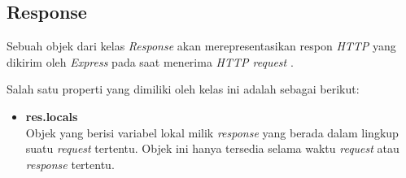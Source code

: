 \begin{itemize}
	
\end{itemize}

%
%	
%	

\subsection{Response}
Sebuah objek dari kelas \textit{Response} akan merepresentasikan respon \textit{HTTP} yang dikirim oleh \textit{Express} pada saat menerima \textit{HTTP request} \cite{tj:10:expressjsapi}.

Salah satu properti yang dimiliki oleh kelas ini adalah sebagai berikut:

\begin{itemize}
	\item \textbf{res.locals} \\
	Objek yang berisi variabel lokal milik \textit{response} yang berada dalam lingkup suatu \textit{request} tertentu. Objek ini hanya tersedia selama waktu \textit{request} atau \textit{response} tertentu.
\end{itemize}

